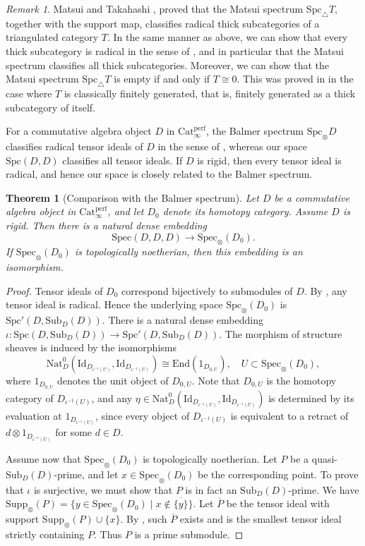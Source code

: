 \documentclass[11pt]{amsart}
\theoremstyle{definition}
\theoremstyle{plain}
\newtheorem{thm}[defn]{Theorem}
\theoremstyle{remark}
\newtheorem{rem}[defn]{Remark}
\newcommand{\Spec}{\mathrm{Spec}}
\newcommand{\Sub}{\mathrm{Sub}}
\newcommand{\Supp}{\mathrm{Supp}}
\newcommand{\Nat}{\mathrm{Nat}}
\newcommand{\Perf}{\mathrm{Cat}_{\infty}^{\mathrm{perf}}}
\newcommand{\Id}{\mathrm{Id}}
\newcommand{\End}{\mathrm{End}}
\newcommand{\oSpec}{\mathrm{Spec}_{\otimes}}
\newcommand{\Spc}{\mathrm{Spc}}
\newcommand{\oSpc}{\mathrm{Spc}_{\otimes}}
\newcommand{\tSpc}{\mathrm{Spc}_{\triangle}}
\numberwithin{equation}{section}
\begin{document}
\begin{rem}
Matsui and Takahashi \cite[Theorem 4.5]{Ma1}, \cite[Theorem 2.9]{MT} proved that the Matsui spectrum \(\tSpc T\), together with the support map, classifies radical thick subcategories of a triangulated category \(T\).  
In the same manner as above, we can show that every thick subcategory is radical in the sense of \cite{Ma1}, and in particular that the Matsui spectrum classifies all thick subcategories.  
Moreover, we can show that the Matsui spectrum \(\tSpc T\) is empty if and only if \(T \cong 0\).  
This was proved in \cite[Proposition~2.17]{HKO} in the case where \(T\) is classically finitely generated, that is, finitely generated as a thick subcategory of itself.
\end{rem}

For a commutative algebra object \(D\) in \(\Perf\), the Balmer spectrum \(\oSpc D\) classifies radical tensor ideals of \(D\) in the sense of \cite{Ba}, whereas our space \(\Spc(D,D)\) classifies all tensor ideals.  
If \(D\) is rigid, then every tensor ideal is radical, and hence our space is closely related to the Balmer spectrum.



\begin{thm}[Comparison with the Balmer spectrum]\label{thm:comparison_with_the_Balmer_spectrum}
Let \(D\) be a commutative algebra object in \(\Perf\), and let \(D_0\) denote its homotopy category.
Assume \(D\) is rigid.
Then there is a natural dense embedding
\[
\Spec(D,D,D)\longrightarrow \oSpec(D_0).
\]
If \(\oSpec(D_0)\) is topologically noetherian, then this embedding is an isomorphism.
\end{thm}
\begin{proof}
  Tensor ideals of \(D_0\) correspond bijectively to submodules of \(D\).
  By \cite[Remark~4.3]{Ba}, any tensor ideal is radical.
  Hence the underlying space \(\oSpc(D_0)\) is \(\Spc'(D,\Sub_D(D))\).
  There is a natural dense embedding \(\iota:\Spc(D,\Sub_D(D))\to\Spc'(D,\Sub_D(D))\).
  The morphism of structure sheaves is induced by the isomorphisms
  \[
  \Nat_D^0(\Id_{D_{\iota^{-1}(U)}},\Id_{D_{\iota^{-1}(U)}})\cong \End(1_{D_{0,U}}),\quad U\subset \oSpec(D_0),
  \]
  where \(1_{D_{0,U}}\) denotes the unit object of \(D_{0,U}\).
  Note that \(D_{0,U}\) is the homotopy category of \(D_{\iota^{-1}(U)}\), and any \(\eta\in \Nat_D^0(\Id_{D_{\iota^{-1}(U)}},\Id_{D_{\iota^{-1}(U)}})\) is determined by its evaluation at \(1_{D_{\iota^{-1}(U)}}\), since every object of \(D_{\iota^{-1}(U)}\) is equivalent to a retract of \(d\otimes 1_{D_{\iota^{-1}(U)}}\) for some \(d\in D\).

  Assume now that \(\oSpec(D_0)\) is topologically noetherian.
  Let \(P\) be a quasi-\(\Sub_D(D)\)-prime, and let \(x\in\oSpec(D_0)\) be the corresponding point.
  To prove that \(\iota\) is surjective, we must show that \(P\) is in fact an \(\Sub_D(D)\)-prime.
  We have \(\Supp_\otimes(P)=\{y\in\oSpec(D_0)\mid x\notin\overline{\{y\}}\}\).
  Let \(\overline{P}\) be the tensor ideal with support \(\Supp_\otimes(P)\cup \{x\}\).
  By \cite[Theorem~4.10]{Ba}, such \(\overline{P}\) exists and is the smallest tensor ideal strictly containing \(P\).
  Thus \(P\) is a prime submodule.
\end{proof}
\end{document}
